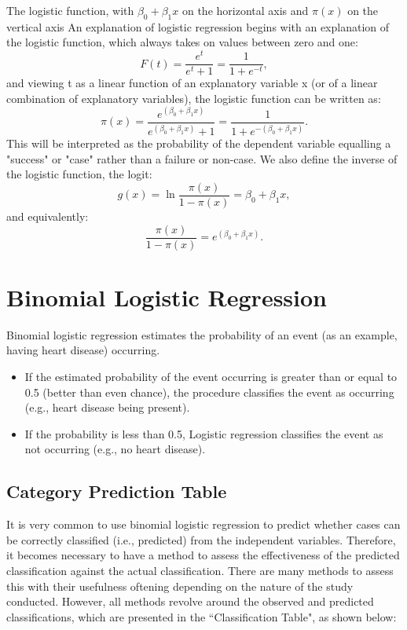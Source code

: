 \documentclass[a4paper,12pt]{article}
\begin{document}
The logistic function, with $\beta_0 + \beta_1 x$ on the horizontal axis and $\pi(x)$ on the vertical axis
An explanation of logistic regression begins with an explanation of the logistic function, which always takes on values between zero and one:
\[
F(t) = \frac{e^t}{e^t+1} = \frac{1}{1+e^{-t}},
\]
and viewing t as a linear function of an explanatory variable x (or of a linear combination of explanatory variables), the logistic function can be written as:
\[\pi(x) = \frac{e^{(\beta_0 + \beta_1 x)}} {e^{(\beta_0 + \beta_1 x)} + 1} = \frac {1} {1+e^{-(\beta_0 + \beta_1 x)}}.
\]
This will be interpreted as the probability of the dependent variable equalling a "success" or "case" rather than a failure or non-case. We also define the inverse of the logistic function, the logit:
\[g(x) = \ln \frac {\pi(x)} {1 - \pi(x)} = \beta_0 + \beta_1 x ,
\]and equivalently:
\[\frac{\pi(x)} {1 - \pi(x)} = e^{(\beta_0 + \beta_1 x)}.
\]



\section{Binomial Logistic Regression}
Binomial logistic regression estimates the probability of an event (as an example, having heart disease) occurring. 
\begin{itemize}
	\item If the estimated probability of the event occurring is greater than or equal to 0.5 (better than even chance), the procedure classifies the event as occurring (e.g., heart disease being present). \item If the probability is less than 0.5, Logistic regression classifies the event as not occurring (e.g., no heart disease). 
\end{itemize}
\subsection{Category Prediction Table}




It is very common to use binomial logistic regression to predict whether cases can be correctly classified (i.e., predicted) from the independent variables. Therefore, it becomes necessary to have a method to assess the effectiveness of the predicted classification against the actual classification. There are many methods to assess this with their usefulness oftening depending on the nature of the study conducted. However, all methods revolve around the observed and predicted classifications, which are presented in the ``Classification Table", as shown below:
\end{document}
